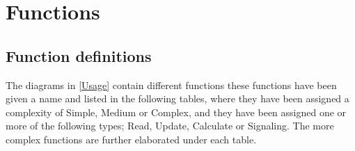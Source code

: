 	
	\chapter{Functions}
	\section{Function definitions}
	The diagrams in \ref{Usage} contain different functions these functions have been given a name and listed in the following tables, where they have been assigned a complexity of Simple, Medium or Complex, and they have been assigned one or more of the following types; Read, Update, Calculate or Signaling. The more complex functions are further elaborated under each table.
